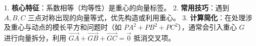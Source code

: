 \begin{summarybox}
1. \textbf{核心特征}：系数相等（均等性）是重心的向量标签。
2. \textbf{常用技巧}：遇到 $A, B, C$ 三点对称出现的向量等式，优先构造或利用重心。
3. \textbf{计算简化}：在处理涉及重心与动点的模长平方和问题时（如 $PA^2+PB^2+PC^2$），通常会引入重心 $G$ 进行向量拆分，利用 $\vec{GA}+\vec{GB}+\vec{GC}=\vec{0}$ 抵消交叉项。
\end{summarybox}